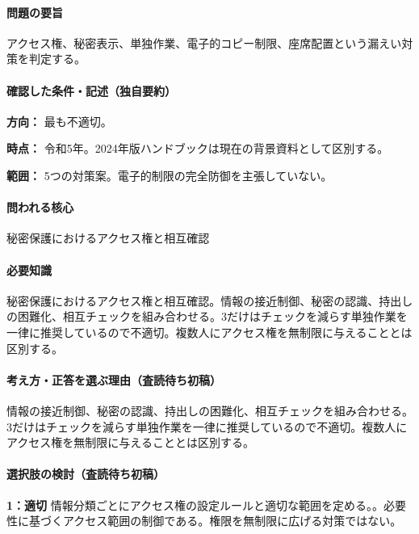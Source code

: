 \paragraph{問題の要旨} アクセス権、秘密表示、単独作業、電子的コピー制限、座席配置という漏えい対策を判定する。

\paragraph{確認した条件・記述（独自要約）}\mbox{}\par

\noindent\textbf{方向：} 最も不適切。\par

\noindent\textbf{時点：} 令和5年。2024年版ハンドブックは現在の背景資料として区別する。\par

\noindent\textbf{範囲：} 5つの対策案。電子的制限の完全防御を主張していない。\par

\paragraph{問われる核心} 秘密保護におけるアクセス権と相互確認

\paragraph{必要知識} 秘密保護におけるアクセス権と相互確認。情報の接近制御、秘密の認識、持出しの困難化、相互チェックを組み合わせる。3だけはチェックを減らす単独作業を一律に推奨しているので不適切。複数人にアクセス権を無制限に与えることとは区別する。

\paragraph{考え方・正答を選ぶ理由（査読待ち初稿）} 情報の接近制御、秘密の認識、持出しの困難化、相互チェックを組み合わせる。3だけはチェックを減らす単独作業を一律に推奨しているので不適切。複数人にアクセス権を無制限に与えることとは区別する。

\paragraph{選択肢の検討（査読待ち初稿）}\mbox{}\par

\noindent\textbf{1：適切} 情報分類ごとにアクセス権の設定ルールと適切な範囲を定める。。必要性に基づくアクセス範囲の制御である。権限を無制限に広げる対策ではない。\par

